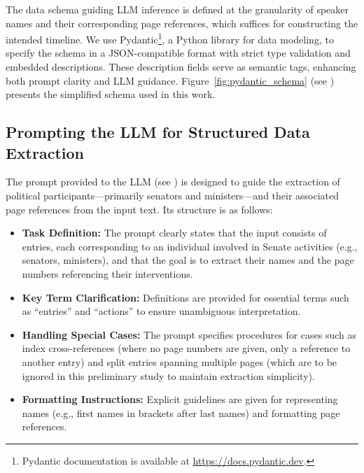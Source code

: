 The data schema guiding LLM inference is defined at the granularity of speaker names and their corresponding page references, which suffices for constructing the intended timeline. We use Pydantic\footnote{Pydantic documentation is available at \url{https://docs.pydantic.dev}.}, a Python library for data modeling, to specify the schema in a JSON-compatible format with strict type validation and embedded descriptions. These description fields serve as semantic tags, enhancing both prompt clarity and LLM guidance. Figure~\ref{fig:pydantic_schema} (see ) presents the simplified schema used in this work.


\subsection{Prompting the LLM for Structured Data Extraction}

The prompt provided to the LLM (see ) is designed to guide the extraction of political participants—primarily senators and ministers—and their associated page references from the input text. Its structure is as follows:

\begin{itemize}
  \item \textbf{Task Definition:} The prompt clearly states that the input consists of entries, each corresponding to an individual involved in Senate activities (e.g., senators, ministers), and that the goal is to extract their names and the page numbers referencing their interventions.
  \item \textbf{Key Term Clarification:} Definitions are provided for essential terms such as ``entries'' and ``actions'' to ensure unambiguous interpretation.
  \item \textbf{Handling Special Cases:} The prompt specifies procedures for cases such as index cross-references (where no page numbers are given, only a reference to another entry) and split entries spanning multiple pages (which are to be ignored in this preliminary study to maintain extraction simplicity).
  \item \textbf{Formatting Instructions:} Explicit guidelines are given for representing names (e.g., first names in brackets after last names) and formatting page references.
\end{itemize}

